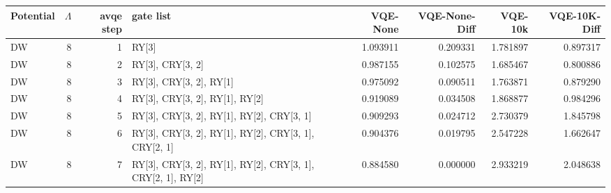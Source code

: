 \begin{tabular}{lrrlrrrr}
\toprule
Potential & $\Lambda$ & avqe step & gate list & VQE-None & VQE-None-Diff & VQE-10k & VQE-10K-Diff \\
\midrule
DW & 8 & 1 & RY[3] & 1.093911 & 0.209331 & 1.781897 & 0.897317 \\
DW & 8 & 2 & RY[3], CRY[3, 2] & 0.987155 & 0.102575 & 1.685467 & 0.800886 \\
DW & 8 & 3 & RY[3], CRY[3, 2], RY[1] & 0.975092 & 0.090511 & 1.763871 & 0.879290 \\
DW & 8 & 4 & RY[3], CRY[3, 2], RY[1], RY[2] & 0.919089 & 0.034508 & 1.868877 & 0.984296 \\
DW & 8 & 5 & RY[3], CRY[3, 2], RY[1], RY[2], CRY[3, 1] & 0.909293 & 0.024712 & 2.730379 & 1.845798 \\
DW & 8 & 6 & RY[3], CRY[3, 2], RY[1], RY[2], CRY[3, 1], CRY[2, 1] & 0.904376 & 0.019795 & 2.547228 & 1.662647 \\
DW & 8 & 7 & RY[3], CRY[3, 2], RY[1], RY[2], CRY[3, 1], CRY[2, 1], RY[2] & 0.884580 & 0.000000 & 2.933219 & 2.048638 \\
\bottomrule
\end{tabular}
